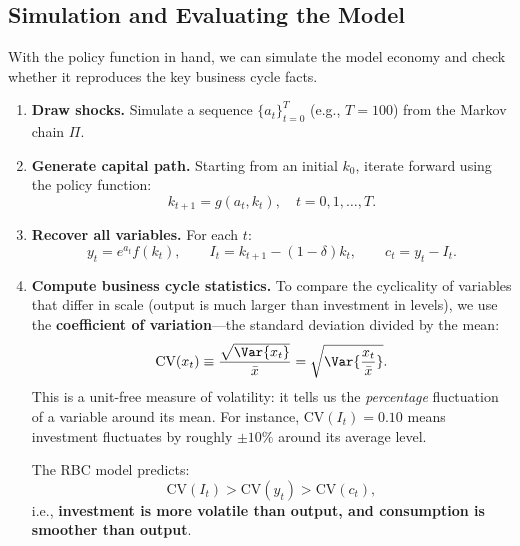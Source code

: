 \subsection{Simulation and Evaluating the Model}

With the policy function in hand, we can simulate the model economy and check whether it reproduces the key business cycle facts.

\begin{enumerate}[label=\textbf{Step \arabic*:}, leftmargin=*]
    \item \textbf{Draw shocks.} Simulate a sequence $\{a_t\}_{t=0}^{T}$ (e.g., $T = 100$) from the Markov chain $\Pi$.
    
    \item \textbf{Generate capital path.} Starting from an initial $k_0$, iterate forward using the policy function:
    $$
    k_{t+1} = g(a_t, k_t), \quad t = 0, 1, \ldots, T.
    $$
    
    \item \textbf{Recover all variables.} For each $t$:
    $$
    y_t = e^{a_t} f(k_t), \qquad I_t = k_{t+1} - (1-\delta)k_t, \qquad c_t = y_t - I_t.
    $$
    
    \item \textbf{Compute business cycle statistics.} To compare the cyclicality of variables that differ in scale (output is much larger than investment in levels), we use the \textbf{coefficient of variation}---the standard deviation divided by the mean:
    $$
    \text{CV}(x_t) \equiv \frac{\sqrt{\Var{x_t}}}{\bar{x}} = \sqrt{\Var{\frac{x_t}{\bar{x}}}}.
    $$
    This is a unit-free measure of volatility: it tells us the \textit{percentage} fluctuation of a variable around its mean. For instance, $\text{CV}(I_t) = 0.10$ means investment fluctuates by roughly $\pm 10\%$ around its average level.
    
    The RBC model predicts:
    $$
    \text{CV}(I_t) > \text{CV}(y_t) > \text{CV}(c_t),
    $$
    i.e., \textbf{investment is more volatile than output, and consumption is smoother than output}.


\end{enumerate}
